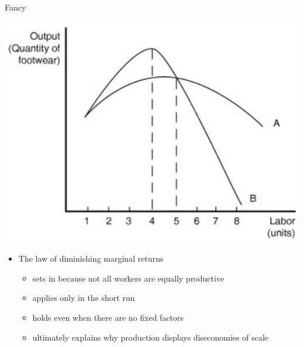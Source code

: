 \documentclass{beamer}
\begin{document}
\begin{frame}[t]{Fancy}
    \begin{center}
        \includegraphics[scale = .6]{images/graph.png}
    \end{center}
    \begin{itemize}
        \item The law of diminishing marginal returns
        \begin{itemize}
            \item sets in because not all workers are equally productive
            \item applies only in the short run
            \item holds even when there are no fixed factors 
            \item ultimately explains why production displays diseconomies of scale
        \end{itemize}
    \end{itemize}
\end{frame}
\end{document}
